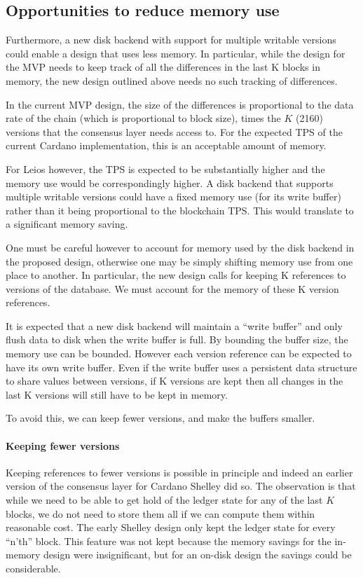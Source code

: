 \documentclass[11pt,a4paper]{article}
\begin{document}
\subsection{Opportunities to reduce memory use}
\label{sec:opportunities-to-reduce-memory-use}

Furthermore, a new disk backend with support for multiple writable versions
could enable a design that uses less memory. In particular, while the design
for the MVP needs to keep track of all the differences in the last K blocks in
memory, the new design outlined above needs no such tracking of differences.

In the current MVP design, the size of the differences is proportional to the
data rate of the chain (which is proportional to block size), times the $K$
(2160) versions that the consensus layer needs access to. For the expected TPS
of the current Cardano implementation, this is an acceptable amount of memory.

For Leios however, the TPS is expected to be substantially higher and the
memory use would be correspondingly higher. A disk backend that supports
multiple writable versions could have a fixed memory use (for its write buffer)
rather than it being proportional to the blockchain TPS. This would translate
to a significant memory saving.

One must be careful however to account for memory used by the disk backend in
the proposed design, otherwise one may be simply shifting memory use from one
place to another. In particular, the new design calls for keeping K references
to versions of the database. We must account for the memory of these K
version references.

It is expected that a new disk backend will maintain a ``write buffer'' and
only flush data to disk when the write buffer is full. By bounding the buffer
size, the memory use can be bounded. However each version reference can be
expected to have its own write buffer. Even if the write buffer uses a
persistent data structure to share values between versions, if K versions are
kept then all changes in the last K versions will still have to be kept in
memory.

To avoid this, we can keep fewer versions, and make the buffers smaller.

\paragraph{Keeping fewer versions}
Keeping references to fewer versions is possible in principle and indeed an
earlier version of the consensus layer for Cardano Shelley did so. The
observation is that while we need to be able to get hold of the ledger state
for any of the last $K$ blocks, we do not need to store them all if we can
compute them within reasonable cost. The early Shelley design only kept the
ledger state for every ``n'th'' block. This feature was not kept because the
memory savings for the in-memory design were insignificant, but for an on-disk
design the savings could be considerable.
\end{document}
